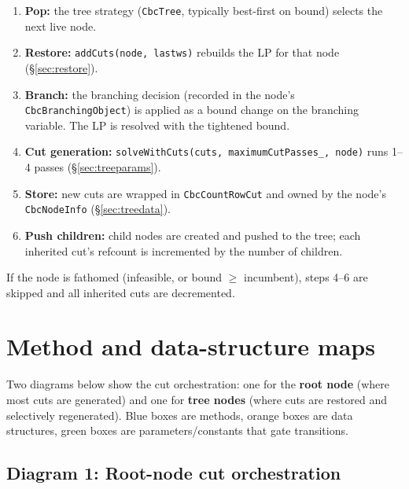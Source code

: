 \documentclass[11pt,a4paper]{article}
\begin{document}
\begin{enumerate}[leftmargin=*]
  \item \textbf{Pop:} the tree strategy (\texttt{CbcTree},
        typically best-first on bound) selects the next live node.
  \item \textbf{Restore:} \texttt{addCuts(node, lastws)} rebuilds
        the LP for that node (\S\ref{sec:restore}).
  \item \textbf{Branch:} the branching decision (recorded in the
        node's \texttt{CbcBranchingObject}) is applied as a bound
        change on the branching variable.  The LP is resolved with
        the tightened bound.
  \item \textbf{Cut generation:}
        \texttt{solveWithCuts(cuts, maximumCutPasses\_, node)} runs
        1--4 passes (\S\ref{sec:treeparams}).
  \item \textbf{Store:} new cuts are wrapped in
        \texttt{CbcCountRowCut} and owned by the node's
        \texttt{CbcNodeInfo} (\S\ref{sec:treedata}).
  \item \textbf{Push children:} child nodes are created and pushed
        to the tree; each inherited cut's refcount is incremented
        by the number of children.
\end{enumerate}

If the node is fathomed (infeasible, or bound $\ge$ incumbent),
steps 4--6 are skipped and all inherited cuts are decremented.

\section{Method and data-structure maps}
\label{sec:diagram}

Two diagrams below show the cut orchestration: one for the
\textbf{root node} (where most cuts are generated) and one for
\textbf{tree nodes} (where cuts are restored and selectively
regenerated).  Blue boxes are methods, orange boxes are data
structures, green boxes are parameters/constants that gate
transitions.

\subsection*{Diagram 1: Root-node cut orchestration}
\end{document}
